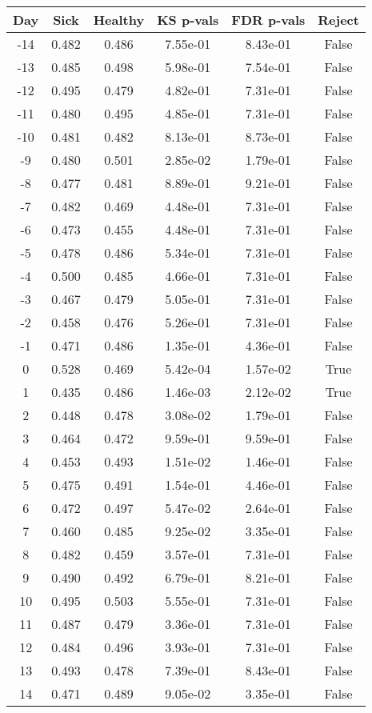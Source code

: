 \begin{tabular}{c|c|c|c|c|c}
Day &  Sick & Healthy &  KS p-vals & FDR p-vals & Reject\\
\hline
-14 & 0.482 &   0.486 &   7.55e-01 &   8.43e-01 &  False\\
-13 & 0.485 &   0.498 &   5.98e-01 &   7.54e-01 &  False\\
-12 & 0.495 &   0.479 &   4.82e-01 &   7.31e-01 &  False\\
-11 & 0.480 &   0.495 &   4.85e-01 &   7.31e-01 &  False\\
-10 & 0.481 &   0.482 &   8.13e-01 &   8.73e-01 &  False\\
 -9 & 0.480 &   0.501 &   2.85e-02 &   1.79e-01 &  False\\
 -8 & 0.477 &   0.481 &   8.89e-01 &   9.21e-01 &  False\\
 -7 & 0.482 &   0.469 &   4.48e-01 &   7.31e-01 &  False\\
 -6 & 0.473 &   0.455 &   4.48e-01 &   7.31e-01 &  False\\
 -5 & 0.478 &   0.486 &   5.34e-01 &   7.31e-01 &  False\\
 -4 & 0.500 &   0.485 &   4.66e-01 &   7.31e-01 &  False\\
 -3 & 0.467 &   0.479 &   5.05e-01 &   7.31e-01 &  False\\
 -2 & 0.458 &   0.476 &   5.26e-01 &   7.31e-01 &  False\\
 -1 & 0.471 &   0.486 &   1.35e-01 &   4.36e-01 &  False\\
  0 & 0.528 &   0.469 &   5.42e-04 &   1.57e-02 &   True\\
  1 & 0.435 &   0.486 &   1.46e-03 &   2.12e-02 &   True\\
  2 & 0.448 &   0.478 &   3.08e-02 &   1.79e-01 &  False\\
  3 & 0.464 &   0.472 &   9.59e-01 &   9.59e-01 &  False\\
  4 & 0.453 &   0.493 &   1.51e-02 &   1.46e-01 &  False\\
  5 & 0.475 &   0.491 &   1.54e-01 &   4.46e-01 &  False\\
  6 & 0.472 &   0.497 &   5.47e-02 &   2.64e-01 &  False\\
  7 & 0.460 &   0.485 &   9.25e-02 &   3.35e-01 &  False\\
  8 & 0.482 &   0.459 &   3.57e-01 &   7.31e-01 &  False\\
  9 & 0.490 &   0.492 &   6.79e-01 &   8.21e-01 &  False\\
 10 & 0.495 &   0.503 &   5.55e-01 &   7.31e-01 &  False\\
 11 & 0.487 &   0.479 &   3.36e-01 &   7.31e-01 &  False\\
 12 & 0.484 &   0.496 &   3.93e-01 &   7.31e-01 &  False\\
 13 & 0.493 &   0.478 &   7.39e-01 &   8.43e-01 &  False\\
 14 & 0.471 &   0.489 &   9.05e-02 &   3.35e-01 &  False\\
\end{tabular}